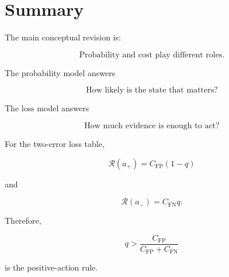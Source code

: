 \documentclass[11pt]{article}
\newcommand{\CFP}{C_{\mathrm{FP}}}
\newcommand{\CFN}{C_{\mathrm{FN}}}
\newcommand{\Risk}{\mathcal{R}}
\begin{document}
%
%

\section{Summary}

The main conceptual revision is:

\[
\boxed{
\text{Probability and cost play different roles.}
}
\]

The probability model answers

\[
\boxed{
\text{How likely is the state that matters?}
}
\]

The loss model answers

\[
\boxed{
\text{How much evidence is enough to act?}
}
\]

For the two-error loss table,

\[
\Risk(a_+)=\CFP(1-q)
\]

and

\[
\Risk(a_-)=\CFN q.
\]

Therefore,

\[
\boxed{
q>
\frac{\CFP}{\CFP+\CFN}
}
\]

is the positive-action rule.
\end{document}
